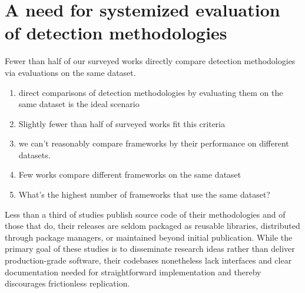\documentclass[manuscript,nonacm]{acmart}
\begin{document}
\section{A need for systemized evaluation of detection methodologies}

Fewer than half of our surveyed works directly compare detection methodologies via evaluations on the same dataset.



\begin{enumerate}
    \item direct comparisons of detection methodologies by evaluating them on the same dataset is the ideal scenario
    \item Slightly fewer than half of surveyed works fit this criteria
	\item we can't reasonably compare frameworks by their performance on different datasets.
	\item Few works compare different frameworks on the same dataset
	\item What's the highest number of frameworks that use the same dataset?
\end{enumerate}

Less than a third of studies publish source code of their methodologies and of those that do, their releases are seldom packaged as reusable libraries, distributed through package managers, or maintained beyond initial publication. 
While the primary goal of these studies is to disseminate research ideas rather than deliver production-grade software, their codebases nonetheless lack interfaces and clear documentation needed for straightforward implementation and thereby discourages frictionless replication.
\end{document}
